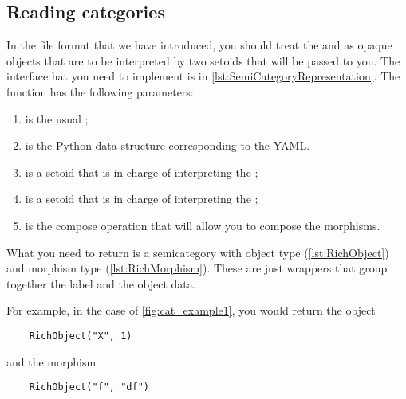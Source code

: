 \vfill
\pagebreak


\subsection{Reading categories}

In the file format that we have introduced, you should treat the  and  as opaque objects that are to be interpreted by two setoids that will be passed to you.
The interface hat you need to implement is in \cref{lst:SemiCategoryRepresentation}.
The function  has the following parameters:
\begin{enumerate}
    \item {} is the usual ;
    \item {} is the Python data structure corresponding to the YAML.
    \item {} is a setoid that is in charge of interpreting the ;
    \item {} is a setoid that is in charge of interpreting the ;
    \item {} is the compose operation that will allow you to compose the morphisms.
\end{enumerate}
What you need to return is a semicategory with object type  (\cref{lst:RichObject}) and morphism type  (\cref{lst:RichMorphism}).
These are just wrappers that group together the label and the object data.

\begin{marginfigure}
    \begin{minipage}{5cm}
    \end{minipage}
    \begin{minipage}{5cm}
    \end{minipage}
\end{marginfigure}
For example, in the case of \cref{fig:cat_example1}, you would return the object
\begin{verbatim}
    RichObject("X", 1)
\end{verbatim}
and the morphism
\begin{verbatim}
    RichObject("f", "df")
\end{verbatim}

